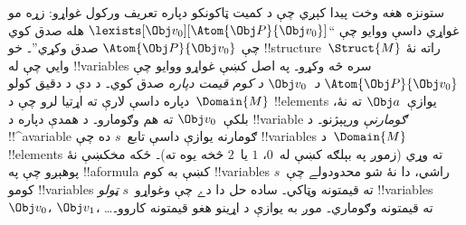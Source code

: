 \documentclass[../../../include/open-logic-section]{subfiles}
\begin{document}
ستونزه هغه وخت پيدا کېږي چې د کميت ټاکونکو دپاره تعريف ورکول
غواړو: زړه مو غواړي داسې ووايو چې
``$\lexists[\Obj v_0][\Atom{\Obj P}{\Obj v_0}]$ هله صدق کوي چې
$\Atom{\Obj P}{\Obj v_0}$ صدق وکړي''۔ خو !!{structure}~$\Struct{M}$
راته نۀ وايي چې له !!{variable}s سره څه وکړو۔ په اصل کښې غواړو
ووايو چې $\Atom{\Obj P}{\Obj v_0}$ \emph{د~$\Obj v_0$ د کوم قيمت
دپاره} صدق کوي۔ د دې د دقيق کولو دپاره داسې لارې ته اړتيا لرو چې
د~$\Domain{M}$ !!{element}s يوازې~$\Obj a$ ته نۀ، بلکې~$\Obj v_0$
ته هم وګومارو۔ د همدې دپاره د !!{variable} \emph{ګومارنې} ورپېژنو۔
د !!^a{variable} ګومارنه يوازې داسې تابع~$s$ ده چې !!{variable}s
د~$\Domain{M}$ !!{element}s ته وړي (زموږ په بېلګه کښې له~$0$، $1$
يا~$2$ څخه يوه ته)۔ ځکه مخکښې نۀ
پوهېږو چې په !!a{formula} کښې به کوم !!{variable}s راشي، دا نۀ شو
محدودولے چې~$s$ کومو !!{variable}s ته قيمتونه وټاکي۔ ساده حل دا
دے چې وغواړو~$s$ \emph{ټولو} !!{variable}s~$\Obj v_0$،
$\Obj v_1$، \dots\@ ته قيمتونه وګوماري۔ موږ به يوازې د اړينو هغو
قيمتونه کاروو۔
\end{document}
